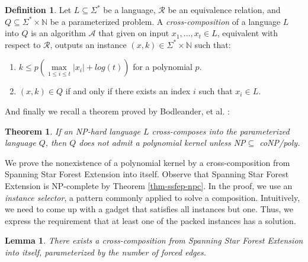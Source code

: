 \documentclass[en]{pracamgr}
\newtheorem{theorem}{Theorem}
\newtheorem{lemma}{Lemma}
\theoremstyle{definition}
\newtheorem{definition}{Definition}
\newcommand{\ssfep}{{\sc Spanning Star Forest Extension}}
\begin{document}
\begin{definition}\label{cross-composition}
	Let $L \subseteq \Sigma^*$ be a language, $\mathcal{R}$ be an equivalence relation, and $Q \subseteq \Sigma^* \times \mathbb{N}$ be a parameterized problem. A \textit{cross-composition} of a language $L$ into $Q$ is an algorithm $\mathcal{A}$ that given on input $x_1,...,x_t \in L$, equivalent with respect to $\mathcal{R}$, outputs an instance $(x,k) \in \Sigma^* \times \mathbb{N}$ such that:
	\begin{enumerate}
		\item $k \leq p(\max\limits_{1 \leq i \leq t} |x_i| + log(t))$ for a polynomial $p$.
		\item $(x,k) \in Q$ if and only if there exists an index $i$ such that $x_i \in L$.
	\end{enumerate}
\end{definition}

And finally we recall a theorem proved by Bodleander, et al. \cite{CROSS}:

\begin{theorem}\label{nokernel}
	If an NP-hard language $L$ cross-composes into the parameterized language $Q$, then $Q$ does not admit a polynomial kernel unless \textit{NP$\subseteq$ coNP/poly}.
\end{theorem}

We prove the nonexistence of a polynomial kernel by a cross-composition from \ssfep{} into itself. Observe that \ssfep{} is NP-complete by Theorem \ref{thm-ssfep-npc}. In the proof, we use an \emph{instance selector}, a pattern commonly applied to solve a composition. Intuitively, we need to come up with a gadget that satisfies all instances but one. Thus, we express the requirement that at least one of the packed instances has a solution.

\begin{lemma}\label{cross-ssfe}
	There exists a cross-composition from \ssfep{} into itself, parameterized by the number of forced edges.
\end{lemma}
\end{document}
